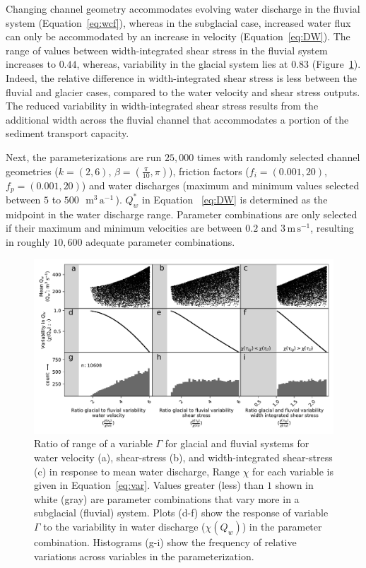 \documentclass[11pt]{article}
\newcommand{\mmma}{$\,\mathrm{m^3\, a^{-1}}$\,}
\newcommand{\unit}[1]{$\mathrm{#1}$}
\begin{document}
\begin{spacing}{1}
          Changing channel geometry accommodates evolving water discharge in the fluvial system (Equation~\ref{eq:wcf}), whereas in the subglacial case, increased water flux can only be accommodated by an increase in velocity (Equation~\ref{eq:DW}).
          The range of values between width-integrated shear stress in the fluvial system increases to $0.44$, whereas, variability in the glacial system lies at $0.83$ (Figure~\ref{fig:range}).
          Indeed, the relative  difference in width-integrated shear stress is less between the fluvial and glacier cases, compared to the water velocity and shear stress outputs.
          The reduced variability in width-integrated shear stress results from the additional width across the fluvial channel that accommodates a portion of the sediment transport capacity.
        
          Next, the parameterizations are run $25,000$ times with randomly selected channel geometries ($k=(2,6)$, $\beta=(\frac{\pi}{10},\pi)$), friction factors ($f_i=(0.001,20)$, $f_p=(0.001,20)$) and water discharges (maximum and minimum values selected between $5$ to $500$ \,\mmma). $Q_w^*$ in Equation ~\ref{eq:DW} is determined as the midpoint in the water discharge range. Parameter combinations are only selected if their maximum and minimum velocities are between $0.2$ and $3$\,\unit{m}\,\unit{s}$^{-1}$, resulting in roughly $10,600$ adequate parameter combinations. 
          
          
          \begin{center}
            \begin{figure}[H]
              \includegraphics[width=0.9\linewidth]{multi_run.pdf}
              \caption{Ratio of range of a variable $\Gamma$ for glacial and fluvial systems for water velocity  (a), shear-stress (b), and  width-integrated shear-stress (c) in response to mean water discharge,
                Range  $\chi$ for each variable is given in Equation~\ref{eq:var}. Values greater (less) than $1$ shown in white (gray) are parameter combinations that vary more in a subglacial (fluvial) system. Plots (d-f) show the response of variable $\Gamma$ to the variability in water discharge ($\chi(Q_w)$) in the parameter combination. 
                Histograms (g-i) show the frequency of relative variations across variables in the parameterization.}
              \label{fig:range}
            \end{figure}
          \end{center}
        

\end{spacing}
\end{document}
